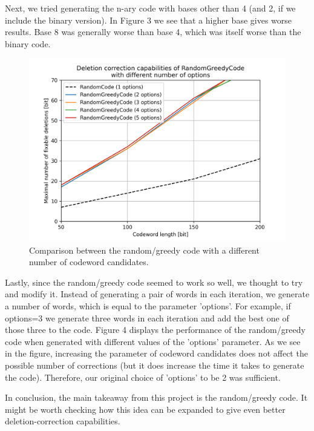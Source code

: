 \documentclass{article}
\begin{document}
\noindent Next, we tried generating the n-ary code with bases other than 4 (and 2, if we include the binary version). In Figure 3 we see that a higher base gives worse results. Base 8 was generally worse than base 4, which was itself worse than the binary code.

\begin{figure}[H]
    \centering
    \includegraphics[width=1\textwidth]{../artifacts/figure4.png}
    \caption{Comparison between the random/greedy code with a different number of codeword candidates.}
\end{figure}

\noindent Lastly, since the random/greedy code seemed to work so well, we thought to try and modify it. Instead of generating a pair of words in each iteration, we generate a number of words, which is equal to the parameter 'options'. For example, if options=3 we generate three words in each iteration and add the best one of those three to the code. Figure 4 displays the performance of the random/greedy code when generated with different values of the 'options' parameter. As we see in the figure, increasing the parameter of codeword candidates does not affect the possible number of corrections (but it does increase the time it takes to generate the code). Therefore, our original choice of 'options' to be 2 was sufficient.

In conclusion, the main takeaway from this project is the random/greedy code. It might be worth checking how this idea can be expanded to give even better deletion-correction capabilities.

\clearpage


\end{document}
